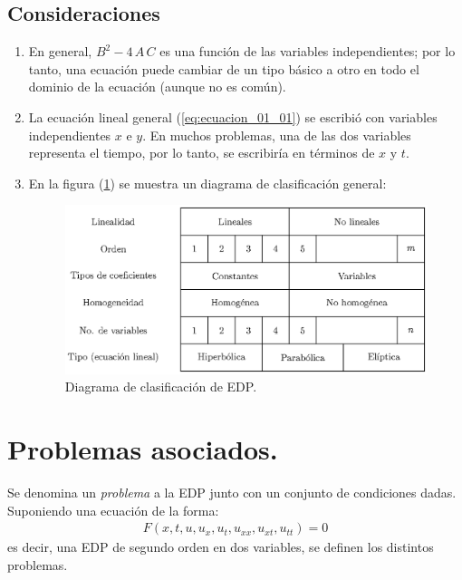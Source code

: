 \subsection*{Consideraciones}
\begin{enumerate}
\item En general, $B^{2} - 4 \, A \, C$ es una función de las variables independientes; por lo tanto, una ecuación puede cambiar de un tipo básico a otro en todo el dominio de la ecuación (aunque no es común).
\item La ecuación lineal general (\ref{eq:ecuacion_01_01}) se escribió con variables independientes $x$ e $y$. En muchos problemas, una de las dos variables representa el tiempo, por lo tanto, se escribiría en términos de $x$ y $t$.
\item En la figura (\ref{fig:figura_clasificacion_EDP}) se muestra un diagrama de clasificación general:
\begin{figure}[H]
    \centering
    \includegraphics[scale=1.1]{Imagenes/Cuadro_Clasificacion_EDP.eps}
    \caption{Diagrama de clasificación de EDP.}
    \label{fig:figura_clasificacion_EDP}
\end{figure}
\end{enumerate}

\section{Problemas asociados.}

Se denomina un \emph{problema} a la EDP junto con un conjunto de condiciones dadas. Suponiendo una ecuación de la forma:
\begin{align*}
F(x, t, u, u_{x}, u_{t}, u_{xx}, u_{xt}, u_{tt}) = 0
\label{eq:ecuacion_01_06}
\end{align*}
es decir, una EDP de segundo orden en dos variables, se definen los distintos problemas.

